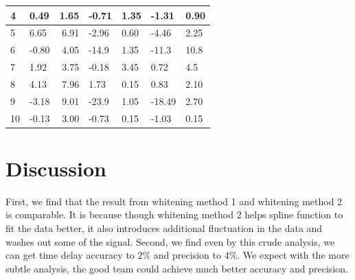 \documentclass[\docopts]{\docclass}
\begin{document}
\begin{table}[ht!]
\begin{tabular}{|l|l|r|l|l|l|l|}
4                                           & 0.49                   & 1.65                                                 & -0.71                   & 1.35                            & -1.31                   & 0.90                            \\ \hline
5                                           & 6.65                   & 6.91                                                 & -2.96                   & 0.60                            & -4.46                   & 2.25                            \\ \hline
6                                           & -0.80                  & 4.05                                                 & -14.9                   & 1.35                            & -11.3                  & 10.8                            \\ \hline
7                                           & 1.92                   & 3.75                                                 & -0.18                   & 3.45                            & 0.72                    & 4.5                             \\ \hline
8                                           & 4.13                   & 7.96                                                 & 1.73                    & 0.15                            & 0.83                    & 2.10                            \\ \hline
9                                           & -3.18                  & 9.01                                                 & -23.9                   & 1.05                            & -18.49                  & 2.70                            \\ \hline
10                                          & -0.13                  & 3.00                                                 & -0.73                   & 0.15                            & -1.03                   & 0.15                            \\ \hline
\end{tabular}
\end{table}

\section{Discussion}
\label{sec:discussion}

First, we find that the result from whitening method 1 and whitening method 2 is comparable. It is because though whitening method 2 helps spline function to fit the data better, it also introduces additional fluctuation in the data and washes out some of the signal. Second, we find even by this crude analysis, we can get time delay accuracy to $2\%$ and precision to $4\%$. We expect with the more subtle analysis, the good team could achieve much better accuracy and precision.  
\end{document}
